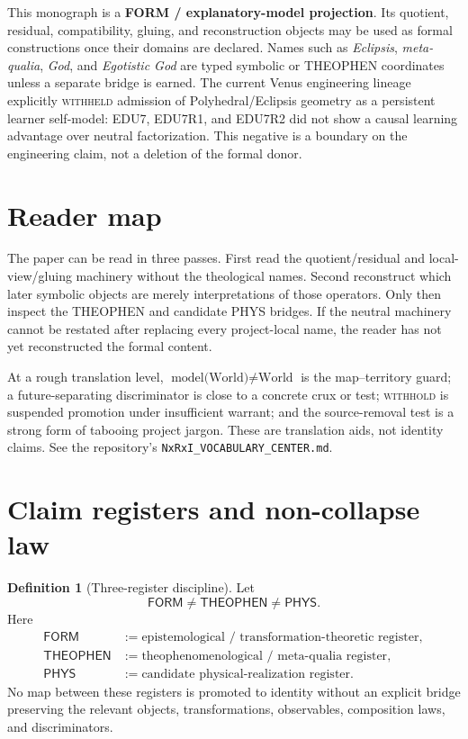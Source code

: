 \documentclass[10pt]{article}
\theoremstyle{pe}
\theoremstyle{definition}
\newtheorem{definition}[theorem]{Definition}
\newcommand{\THEOPHEN}{\mathsf{THEOPHEN}}
\newcommand{\FORM}{\mathsf{FORM}}
\newcommand{\PHYS}{\mathsf{PHYS}}
\begin{document}
\begin{tcolorbox}[breakable,colback=gray!4,colframe=gray!45,title=\textbf{Register and current status}]
This monograph is a \textbf{FORM / explanatory-model projection}.  Its quotient,
residual, compatibility, gluing, and reconstruction objects may be used as formal
constructions once their domains are declared.  Names such as \emph{Eclipsis},
\emph{meta-qualia}, \emph{God}, and \emph{Egotistic God} are typed symbolic or
THEOPHEN coordinates unless a separate bridge is earned.  The current Venus
engineering lineage explicitly \textsc{withheld} admission of Polyhedral/Eclipsis
geometry as a persistent learner self-model: EDU7, EDU7R1, and EDU7R2 did not
show a causal learning advantage over neutral factorization.  This negative is a
boundary on the engineering claim, not a deletion of the formal donor.
\end{tcolorbox}

\section*{Reader map}
The paper can be read in three passes.  First read the quotient/residual and
local-view/gluing machinery without the theological names.  Second reconstruct
which later symbolic objects are merely interpretations of those operators.  Only
then inspect the THEOPHEN and candidate PHYS bridges.  If the neutral machinery
cannot be restated after replacing every project-local name, the reader has not yet
reconstructed the formal content.

\begin{tcolorbox}[breakable,colback=blue!3,colframe=gray!45,title=\textbf{Rationalist vocabulary bridge}]
At a rough translation level, $\text{model(World)}\neq\text{World}$ is the
map--territory guard; a future-separating discriminator is close to a concrete
crux or test; \textsc{withhold} is suspended promotion under insufficient warrant;
and the source-removal test is a strong form of tabooing project jargon.  These
are translation aids, not identity claims.  See the repository's
\texttt{NxRxI\_VOCABULARY\_CENTER.md}.
\end{tcolorbox}
\section{Claim registers and non-collapse law}

\begin{definition}[Three-register discipline]
Let
\[
  \FORM\neq\THEOPHEN\neq\PHYS.
\]
Here
\[
\begin{aligned}
\FORM &:= \text{epistemological / transformation-theoretic register},\\
\THEOPHEN &:= \text{theophenomenological / meta-qualia register},\\
\PHYS &:= \text{candidate physical-realization register}.
\end{aligned}
\]
No map between these registers is promoted to identity without an explicit bridge preserving the relevant objects, transformations, observables, composition laws, and discriminators.
\end{definition}
\end{document}
